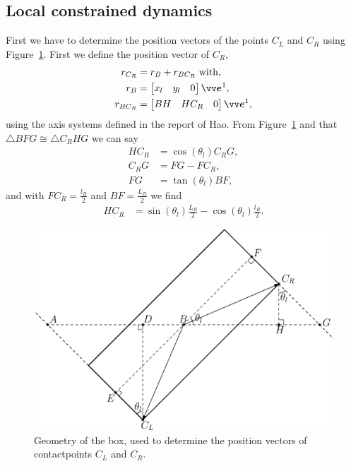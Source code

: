 \documentclass[../DC2017114Bouma.tex]{subfiles}
\begin{document}
\subsection*{Local constrained dynamics}
First we have to determine the position vectors of the points $C_L$ and $C_R$ using Figure~\ref{fig:plankboxgeo}. First we define the position vector of $C_R$,
\begin{align}
r_{C_R} &= r_B + r_{BC_R}\ \text{with},\\
r_B &= \begin{bmatrix}
x_l & y_l & 0
\end{bmatrix} \evec^1,\\
r_{BC_R} &= \begin{bmatrix}
BH & HC_R & 0
\end{bmatrix} \evec^1,
\end{align}
using the axis systems defined in the report of Hao. From Figure~\ref{fig:plankboxgeo} and that $\triangle BFG \cong \triangle C_RHG$ we can say
\begin{align}
HC_R &= \cos(\theta_l)C_RG,\\
C_RG &= FG - FC_R,\\
FG &= \tan(\theta_l)BF,
\end{align}
and with $FC_R = \frac{l_B}{2}$ and $BF = \frac{L_B}{2}$ we find
\begin{align}
HC_R &= \sin(\theta_l)\frac{L_B}{2} - \cos(\theta_l)\frac{l_B}{2}.
\end{align}
\begin{figure}[h]
\centering
\includegraphics[width=\textwidth]{plankboxgeo.eps}\caption{Geometry of the box, used to determine the position vectors of contactpoints $C_L$ and $C_R$.}\label{fig:plankboxgeo}
\end{figure}
\end{document}
